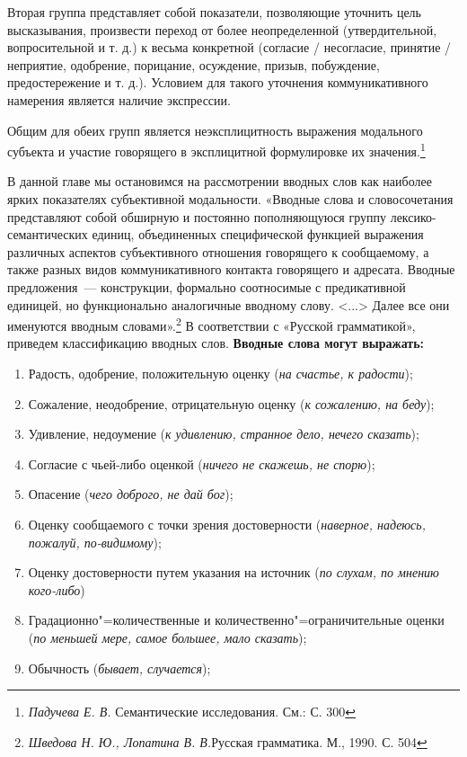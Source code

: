 \documentclass{kursa4}
\begin{document}
      Вторая группа представляет собой показатели, позволяющие уточнить цель высказывания, произвести переход от более неопределенной (утвердительной, вопросительной и т. д.) к весьма конкретной (согласие / несогласие, принятие / неприятие, одобрение, порицание, осуждение, призыв, побуждение, предостережение и т. д.). Условием для такого уточнения коммуникативного намерения является наличие экспрессии. 

      Общим для обеих групп является неэксплицитность выражения модального субъекта и участие говорящего в эксплицитной формулировке их значения.\footnote{\textit{Падучева Е. В. }Семантические исследования. См.: С. 300}

      В данной главе мы остановимся на рассмотрении вводных слов как наиболее ярких показателях субъективной модальности. «Вводные слова и словосочетания представляют собой обширную и постоянно пополняющуюся группу лексико-семантических единиц, объединенных специфической функцией выражения различных аспектов субъективного отношения говорящего к сообщаемому, а также разных видов коммуникативного контакта говорящего и адресата. Вводные предложения~--- конструкции, формально соотносимые с предикативной единицей, но функционально аналогичные вводному слову. \textless{}...\textgreater{}
      Далее все они именуются вводным словами».\footnote{\textit{Шведова Н. Ю., Лопатина В. В.}{Русская грамматика. М., 1990. С. 504}}\newline
      В соответствии с «Русской грамматикой», приведем классификацию вводных слов. \textbf{Вводные слова могут выражать:}
      \begin{enumerate}
        \item Радость, одобрение, положительную оценку (\textit{на счастье, к радости}); \item Сожаление, неодобрение, отрицательную оценку (\textit{к сожалению, на беду}); \item Удивление, недоумение (\textit{к удивлению, странное дело, нечего сказать}); \item Согласие с чьей-либо оценкой (\textit{ничего не скажешь, не спорю}); \item Опасение (\textit{чего доброго, не дай бог}); \item Оценку сообщаемого с точки зрения достоверности (\textit{наверное, надеюсь, пожалуй, по-видимому}); \item Оценку достоверности путем указания на источник (\textit{по слухам, по мнению кого-либо}) \item Градационно"=количественные и количественно"=ограничительные оценки (\textit{по меньшей мере, самое большее, мало сказать}); \item Обычность (\textit{бывает, случается}); \end{enumerate}
\end{document}
